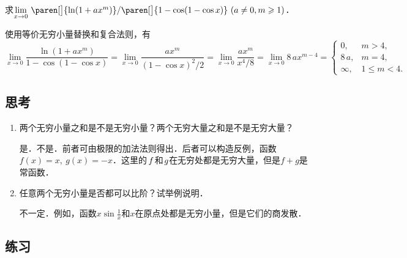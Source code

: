 \begin{example*}
  求\(\lim\limits_{x\to0} \,\paren[\big]{\ln(1+ax^m)}/\paren[\big]{1-\cos(1-\cos x)}\ (a \ne 0, m \ge 1)\)． %

  \begin{remark}
    使用等价无穷小量替换和复合法则，有
    \begin{equation*}
      \lim_{x\to0} \frac{\ln(1+ax^m)}{1-\cos(1-\cos x)}
      = \lim_{x\to0} \frac{ax^m}{(1-\cos x)^2\!/2}
      = \lim_{x\to0} \frac{ax^m}{x^4\!/8}
      = \lim_{x\to0} 8\,ax^{m-4} =
      \begin{cases}
        0, & m > 4, \\
        8\,a, & m = 4, \\
        \infty, & 1 \le m < 4.
      \end{cases}
    \end{equation*}
  \end{remark}
\end{example*}

\subsection*{思考}

\begin{enumerate}
\item 两个无穷小量之和是不是无穷小量？两个无穷大量之和是不是无穷大量？

  \ifshowsolp
    是．不是．前者可由极限的加法法则得出．后者可以构造反例，函数\(f(x) = x,\ g(x) = -x\)．这里的\(\,f\mkern1mu\)和\(\mkern1mu g\)在无穷处都是无穷大量，但是\(f+g\)是常函数．
  \fi

\item 任意两个无穷小量是否都可以比阶？试举例说明．

  \ifshowsolp
    不一定．例如，函数\(x \sin\frac1x\)和\(x\)在原点处都是无穷小量，但是它们的商发散．
  \fi
\end{enumerate}

\ifshowex
{}
\subsection*{练习}

